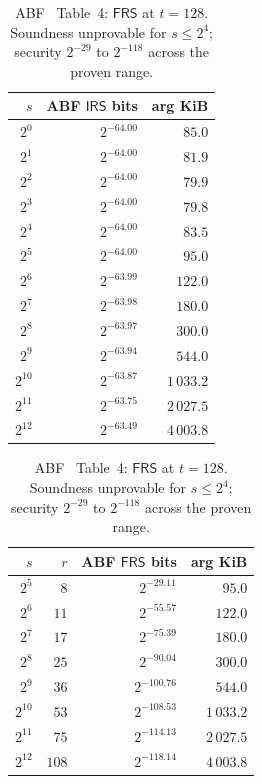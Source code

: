 \documentclass[11pt]{article}
\theoremstyle{definition}
\theoremstyle{remark}
\begin{document}
\begin{table}[h]
\centering
\small
\begin{minipage}{.48\linewidth}
\centering
\begin{tabular}{rrr}
\toprule
$s$ & ABF $\mathsf{IRS}$ bits & arg KiB \\
\midrule
$2^0$ & $2^{-64.00}$ & $85.0$ \\
$2^1$ & $2^{-64.00}$ & $81.9$ \\
$2^2$ & $2^{-64.00}$ & $79.9$ \\
$2^3$ & $2^{-64.00}$ & $\mathbf{79.8}$ \\
$2^4$ & $2^{-64.00}$ & $83.5$ \\
$2^5$ & $2^{-64.00}$ & $95.0$ \\
$2^6$ & $2^{-63.99}$ & $122.0$ \\
$2^7$ & $2^{-63.98}$ & $180.0$ \\
$2^8$ & $2^{-63.97}$ & $300.0$ \\
$2^9$ & $2^{-63.94}$ & $544.0$ \\
$2^{10}$ & $2^{-63.87}$ & $1\,033.2$ \\
$2^{11}$ & $2^{-63.75}$ & $2\,027.5$ \\
$2^{12}$ & $2^{-63.49}$ & $4\,003.8$ \\
\bottomrule
\end{tabular}
\caption{ABF~\cite{ABF} Table~2: $\mathsf{IRS}$ at $t = 128$.
Security ${\sim}64$ bits (half target);
argument min.\ ${\sim}79.8$ KiB at $s = 2^{3}$.}
\label{tab:abf-fixedt-irs}
\end{minipage}\hfill
\begin{minipage}{.48\linewidth}
\centering
\begin{tabular}{rrrr}
\toprule
$s$ & $r$ & ABF $\mathsf{FRS}$ bits & arg KiB \\
\midrule
$2^5$ & $8$ & $2^{-29.11}$ & $95.0$ \\
$2^6$ & $11$ & $2^{-55.57}$ & $122.0$ \\
$2^7$ & $17$ & $2^{-75.39}$ & $180.0$ \\
$2^8$ & $25$ & $2^{-90.04}$ & $300.0$ \\
$2^9$ & $36$ & $2^{-100.76}$ & $544.0$ \\
$2^{10}$ & $53$ & $2^{-108.53}$ & $1\,033.2$ \\
$2^{11}$ & $75$ & $2^{-114.13}$ & $2\,027.5$ \\
$2^{12}$ & $108$ & $2^{-118.14}$ & $4\,003.8$ \\
\bottomrule
\end{tabular}
\caption{ABF~\cite{ABF} Table~4: $\mathsf{FRS}$ at $t = 128$.
Soundness unprovable for $s \leq 2^{4}$;
security $2^{-29}$ to $2^{-118}$ across the proven range.}
\label{tab:abf-fixedt-frs}
\end{minipage}
\end{table}
\end{document}
